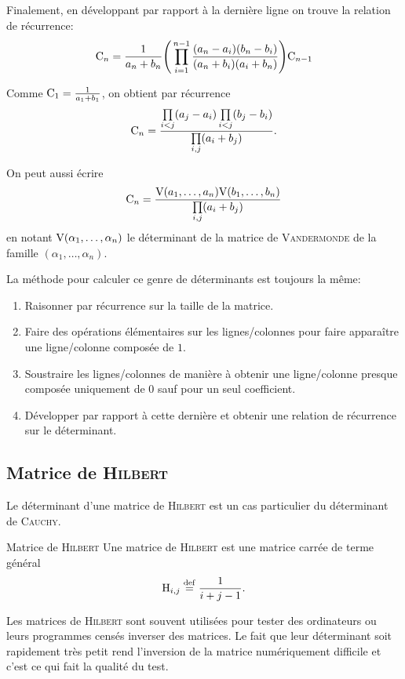 \begin{preuve}
    Finalement, en développant par rapport à la dernière ligne on trouve la relation de récurrence:
    $$\mathrm{C}_n =  \frac{1}{a_n + b_n} \Bigg( \prod\limits_{i = 1}^{n-1}\frac{(a_n - a_i)(b_n - b_i)}{(a_n + b_i)(a_i + b_n)} \Bigg) \mathrm{C}_{n-1}$$
    
    Comme $\mathrm{C}_1 = \frac{1}{a_1+b_1}$, on obtient par récurrence
    $$\mathrm{C}_n = \frac{\prod\limits_{i<j}(a_j-a_i) \prod\limits_{i<j}(b_j-b_i)}{\prod\limits_{i,j}(a_i+b_j)}.$$
\end{preuve}

\begin{remarque}
    On peut aussi écrire
    $$\mathrm{C}_n = \frac{\mathrm{V}(a_1, \dots, a_n) \mathrm{V}(b_1, \dots, b_n)}{\prod\limits_{i,j}(a_i+b_j)}$$
    en notant $\mathrm{V}(\alpha_1, \dots, \alpha_n)$ le déterminant de la matrice de \textsc{Vandermonde} de la famille $(\alpha_1, \dots, \alpha_n)$.
\end{remarque}

\begin{methode}
    La méthode pour calculer ce genre de déterminants  est toujours la même: 
    \begin{enumerate}
        \item Raisonner par récurrence sur la taille de la matrice.
        \item Faire des opérations élémentaires sur les lignes/colonnes pour faire apparaître une ligne/colonne composée de $1$. 
        \item Soustraire les lignes/colonnes de manière à obtenir une ligne/colonne presque composée uniquement de 0 sauf pour un seul coefficient. 
        \item Développer par rapport à cette dernière et obtenir une relation de récurrence sur le déterminant. 
    \end{enumerate}
\end{methode}

\subsection{Matrice de \textsc{Hilbert}}

Le déterminant d'une matrice de \textsc{Hilbert} est un cas particulier du déterminant de \textsc{Cauchy}.

\begin{defi}{Matrice de \textsc{Hilbert}}
    Une matrice de \textsc{Hilbert} est une matrice carrée de terme général
    $$\mathrm{H}_{i,j} \overset{\mathrm{\tiny def}}{=} {\frac {1}{i+j-1}}.$$
\end{defi}

Les matrices de \textsc{Hilbert} sont souvent utilisées pour tester des ordinateurs ou leurs programmes censés inverser des matrices. Le fait que leur déterminant soit rapidement très petit rend l'inversion de la matrice numériquement difficile et c'est ce qui fait la qualité du test. 